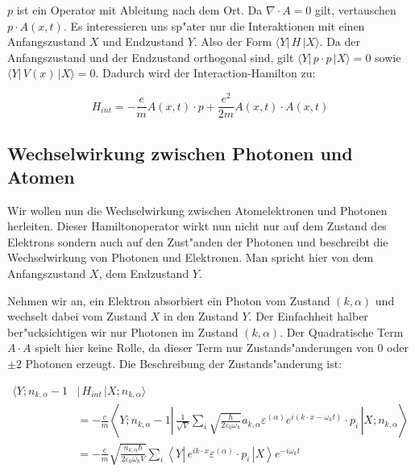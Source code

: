 $p$ ist ein Operator mit Ableitung nach dem Ort. Da $\nabla \cdot A = 0$ gilt, vertauschen $p \cdot A(x, t)$. Es interessieren uns sp"ater nur die Interaktionen mit einen Anfangszustand $X$ und Endzustand $Y$. Also der Form $\langle Y| \, H \, |X \rangle$. Da der Anfangszustand und der Endzustand orthogonal sind, gilt $\langle Y| \, p \cdot p \, |X \rangle = 0$ sowie $\langle Y| \, V(x) \, |X \rangle = 0$. Dadurch wird der Interaction-Hamilton zu:

\begin{equation*}
H_{int} = -\frac{e}{m} A(x, t) \cdot p + \frac{e^2}{2m}A(x, t) \cdot A(x, t)
\end{equation*}

\subsection{Wechselwirkung zwischen Photonen und Atomen}

Wir wollen nun die Wechselwirkung zwischen Atomelektronen und Photonen herleiten. Dieser Hamiltonoperator wirkt nun nicht nur auf dem Zustand des Elektrons sondern auch auf den Zust"anden der Photonen und beschreibt die Wechselwirkung von Photonen und Elektronen. Man spricht hier von dem Anfangszustand $X$, dem Endzustand $Y$.

Nehmen wir an, ein Elektron absorbiert ein Photon vom Zustand $(k,\alpha)$ und wechselt dabei vom Zustand $X$ in den Zustand $Y$. Der Einfachheit halber ber"ucksichtigen wir nur Photonen im Zustand $(k,\alpha)$. Der Quadratische Term $A \cdot A$ spielt hier keine Rolle, da dieser Term nur Zustands"anderungen von $0$ oder $\pm 2$ Photonen erzeugt. Die Beschreibung der Zustands"anderung ist:

\begin{equation} \label{fq:absorbtion}
\begin{split}
\langle Y; n_{k,\alpha} - 1 &|\, H_{int} \,| X; n_{k,\alpha} \rangle \\
&= -\frac{e}{m} \left\langle Y; n_{k,\alpha} - 1 \left| 
 \, \frac{1}{\sqrt{V}} \sum_i \sqrt{\frac{\hbar}{2 \varepsilon_0 \omega_k}}a_{k,\alpha} \varepsilon^{(\alpha)} e^{i(k \cdot x-\omega_k t)} \cdot p_i \,
\right| X; n_{k,\alpha} \right\rangle\\
&= -\frac{e}{m} \sqrt{\frac{n_{k,\alpha} \hbar}{2 \varepsilon_0 \omega_k V}} \sum_i \left\langle Y \left|
\, e^{ik \cdot x} \varepsilon^{(\alpha)} \cdot p_i \,
\right| X \right\rangle e^{-i\omega_k t}
\end{split}
\end{equation}

